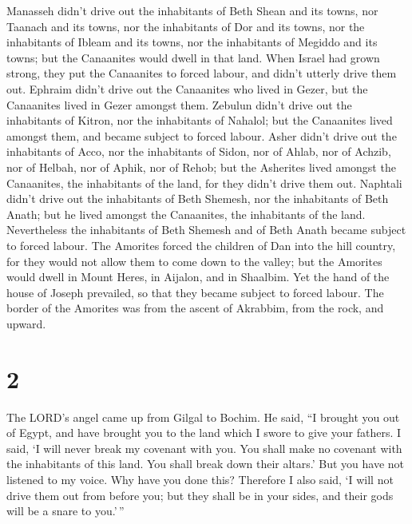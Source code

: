  Manasseh didn't drive out the inhabitants of Beth Shean
and its towns, nor Taanach and its towns, nor the inhabitants of Dor and
its towns, nor the inhabitants of Ibleam and its towns, nor the
inhabitants of Megiddo and its towns; but the Canaanites would dwell in
that land.  When Israel had grown strong, they put the
Canaanites to forced labour, and didn't utterly drive them out.
 Ephraim didn't drive out the Canaanites who lived in
Gezer, but the Canaanites lived in Gezer amongst them. 
Zebulun didn't drive out the inhabitants of Kitron, nor the inhabitants
of Nahalol; but the Canaanites lived amongst them, and became subject to
forced labour.  Asher didn't drive out the inhabitants of
Acco, nor the inhabitants of Sidon, nor of Ahlab, nor of Achzib, nor of
Helbah, nor of Aphik, nor of Rehob;  but the Asherites
lived amongst the Canaanites, the inhabitants of the land, for they
didn't drive them out.  Naphtali didn't drive out the
inhabitants of Beth Shemesh, nor the inhabitants of Beth Anath; but he
lived amongst the Canaanites, the inhabitants of the land. Nevertheless
the inhabitants of Beth Shemesh and of Beth Anath became subject to
forced labour.  The Amorites forced the children of Dan
into the hill country, for they would not allow them to come down to the
valley;  but the Amorites would dwell in Mount Heres, in
Aijalon, and in Shaalbim. Yet the hand of the house of Joseph prevailed,
so that they became subject to forced labour.  The border
of the Amorites was from the ascent of Akrabbim, from the rock, and
upward.

\hypertarget{section-1}{%
\section{2}\label{section-1}}

 The LORD's angel came up from Gilgal to Bochim. He said,
``I brought you out of Egypt, and have brought you to the land which I
swore to give your fathers. I said, `I will never break my covenant with
you.  You shall make no covenant with the inhabitants of
this land. You shall break down their altars.' But you have not listened
to my voice. Why have you done this?  Therefore I also
said, `I will not drive them out from before you; but they shall be in
your sides, and their gods will be a snare to you.'\,''


